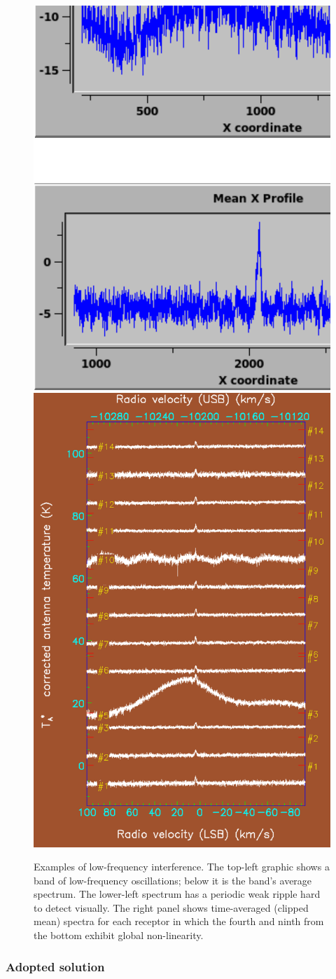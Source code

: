 \documentclass[final,authoryear,5p,times,twocolumn]{elsarticle}
\begin{document}
\begin{figure}[!ht]
\includegraphics[width=0.495\columnwidth]{P61_f2a}
\includegraphics[width=0.495\columnwidth]{P61_f2b}
\caption{Examples of low-frequency interference.  The top-left graphic
 shows a band of low-frequency oscillations; below it is the band's
 average spectrum.  The lower-left spectrum has a periodic weak
 ripple hard to detect visually.  The right panel shows time-averaged
 (clipped mean) spectra for each receptor in which the fourth and
  ninth from the bottom exhibit global non-linearity.}
\label{fig:badbase:interference}
\end{figure}

\subsubsection{Adopted solution}
\end{document}
